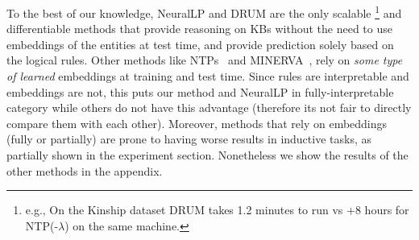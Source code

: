 \documentclass{article}
\begin{document}
To the best of our knowledge, NeuralLP and DRUM are the only scalable \footnote{e.g., On the Kinship dataset DRUM takes 1.2 minutes to run vs +8 hours for NTP(-$\lambda$) \cite{rocktaschel2017end} on the same machine.} and differentiable methods that provide reasoning on KBs without the need to use embeddings of the entities at test time, and provide prediction solely based on the logical rules. Other methods like NTPs~\cite{minervini2018towards, rocktaschel2017end} and MINERVA~\cite{das2018go}, rely on \textit{some type of learned} embeddings at training and test time. Since rules are interpretable and embeddings are not, this puts our method and NeuralLP in fully-interpretable category while others do not have this advantage (therefore its not fair to directly compare them with each other). Moreover, methods that rely on embeddings (fully or partially) are prone to having worse results in inductive tasks, as partially shown in the experiment section. Nonetheless we show the results of the other methods in the appendix.

\begin{table}[h!]
    \centering
    \caption{Experiment results with maximum rule length 2 and 3}\label{tab:srl_results}
\end{table}
\end{document}
